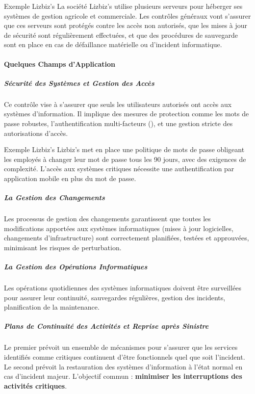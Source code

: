 \begin{boxlizbiz}{Exemple Lizbiz's}
La société Lizbiz's utilise plusieurs serveurs pour héberger ses systèmes de gestion
agricole et commerciale. Les contrôles généraux vont s'assurer que ces serveurs sont
protégés contre les accès non autorisés, que les mises à jour de sécurité sont
régulièrement effectuées, et que des procédures de sauvegarde sont en place en cas de
défaillance matérielle ou d'incident informatique.
\end{boxlizbiz}

\paragraph{Quelques Champs d'Application}

\subparagraph{Sécurité des Systèmes et Gestion des Accès}
Ce contrôle vise à s'assurer que seuls les utilisateurs autorisés ont accès aux
systèmes d'information. Il implique des mesures de protection comme les mots de
passe robustes, l'authentification multi-facteurs (), et une gestion stricte
des autorisations d'accès.

\begin{boxlizbiz}{Exemple Lizbiz's}
Lizbiz's met en place une politique de mots de passe obligeant les employés à changer
leur mot de passe tous les 90 jours, avec des exigences de complexité. L'accès aux
systèmes critiques nécessite une authentification par application mobile en plus du
mot de passe.
\end{boxlizbiz}

\subparagraph{La Gestion des Changements}
Les processus de gestion des changements garantissent que toutes les modifications
apportées aux systèmes informatiques (mises à jour logicielles, changements
d'infrastructure) sont correctement planifiées, testées et approuvées, minimisant les
risques de perturbation.

\subparagraph{La Gestion des Opérations Informatiques}
Les opérations quotidiennes des systèmes informatiques doivent être surveillées pour
assurer leur continuité, sauvegardes régulières, gestion des incidents, planification
de la maintenance.

\subparagraph{Plans de Continuité des Activités et Reprise après Sinistre}
Le premier prévoit un ensemble de mécanismes pour s'assurer que les services
identifiés comme critiques continuent d'être fonctionnels quel que soit l'incident.
Le second prévoit la restauration des systèmes d'information à l'état normal en cas
d'incident majeur. L'objectif commun : \textbf{minimiser les interruptions des activités
critiques}.

